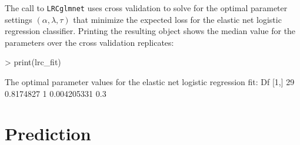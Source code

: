 \documentclass{article}
\begin{document}
\noindent The call to {\tt LRCglmnet} uses cross validation to solve for the optimal parameter settings 
$\left(\alpha, \lambda, \tau\right)$ that minimize the expected loss for the elastic net logistic regression 
classifier. Printing the resulting object shows the median value for the parameters over the cross validation 
replicates:
 
\begin{Schunk}
\begin{Sinput}
> print(lrc_fit)
\end{Sinput}
\begin{Soutput}
The optimal parameter values for the elastic net logistic regression fit: 
     Df      %
[1,] 29 0.8174827     1 0.004205331 0.3
\end{Soutput}
\end{Schunk}

\section{Prediction}
\end{document}
